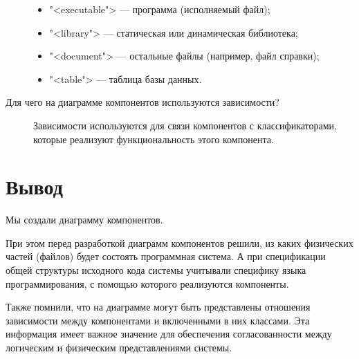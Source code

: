 \begin{description}
\begin{itemize}
			\item "<executable"> --- программа (исполняемый файл);
			\item "<library"> --- статическая или динамическая библиотека;
			\item "<document"> --- остальные файлы (например, файл справки);
			\item "<table"> --- таблица базы данных.
		\end{itemize}
	\item [Для чего на диаграмме компонентов используются зависимости?]
		Зависимости используются для связи компонентов с классификаторами,
		которые реализуют функциональность этого компонента.
\end{description}

\clearpage

\section*{\LARGE Вывод}
Мы создали диаграмму компонентов.\par
При этом перед разработкой диаграмм компонентов решили, из каких
физических частей (файлов) будет состоять программная система.
А при спецификации общей структуры исходного кода системы
учитывали специфику языка программирования, с помощью
которого реализуются компоненты.\par
Также помнили, что на диаграмме могут быть представлены отношения
зависимости между компонентами и включенными в них классами.
Эта информация имеет важное значение для обеспечения согласованности
между логическим и физическим представлениями системы.

